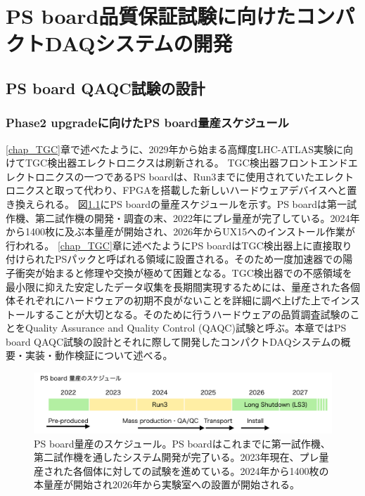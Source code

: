 \chapter{PS board品質保証試験に向けたコンパクトDAQシステムの開発}
\label{chap_QAQC}

\section{PS board QAQC試験の設計}
\label{sec_QAQCdesign}
\subsection{Phase2 upgradeに向けたPS board量産スケジュール}
\label{subsec_PSBschedule}
\ref{chap_TGC}章で述べたように、2029年から始まる高輝度LHC-ATLAS実験に向けてTGC検出器エレクトロニクスは刷新される。
TGC検出器フロントエンドエレクトロニクスの一つであるPS boardは、Run3までに使用されていたエレクトロニクスと取って代わり、FPGAを搭載した新しいハードウェアデバイスへと置き換えられる。
図\ref{PSBschedule}にPS boardの量産スケジュールを示す。PS boardは第一試作機、第二試作機の開発・調査の末、2022年にプレ量産が完了している。2024年から1400枚に及ぶ本量産が開始され、2026年からUX15へのインストール作業が行われる。
\ref{chap_TGC}章に述べたようにPS boardはTGC検出器上に直接取り付けられたPSパックと呼ばれる領域に設置される。そのため一度加速器での陽子衝突が始まると修理や交換が極めて困難となる。TGC検出器での不感領域を最小限に抑えた安定したデータ収集を長期間実現するためには、量産された各個体それぞれにハードウェアの初期不良がないことを詳細に調べ上げた上でインストールすることが大切となる。そのために行うハードウェアの品質調査試験のことをQuality Assurance and Quality Control (QAQC)試験と呼ぶ。本章ではPS board QAQC試験の設計とそれに際して開発したコンパクトDAQシステムの概要・実装・動作検証について述べる。

\begin{figure} 
\centering
\includegraphics[width=16cm]{fig/QAQC/PSBschedule.png}
\caption[PS board量産のスケジュール]{PS board量産のスケジュール。PS boardはこれまでに第一試作機、第二試作機を通したシステム開発が完了いる。2023年現在、プレ量産された各個体に対しての試験を進めている。2024年から1400枚の本量産が開始され2026年から実験室への設置が開始される。}
\label{PSBschedule}
\end{figure}

